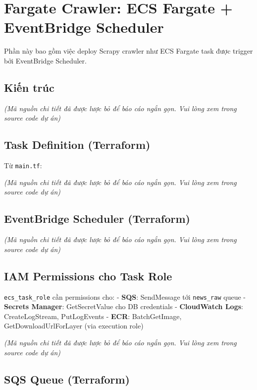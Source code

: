 \hypertarget{fargate-crawler-ecs-fargate-eventbridge-scheduler}{%
\section{Fargate Crawler: ECS Fargate + EventBridge
Scheduler}}

Phần này bao gồm việc deploy Scrapy crawler như ECS Fargate task được
trigger bởi EventBridge Scheduler.

\hypertarget{kiux1ebfn-truxfac}{%
\subsection{Kiến trúc}}

\emph{(Mã nguồn chi tiết đã được lược bỏ để báo cáo ngắn gọn. Vui lòng
xem trong source code dự án)}

\hypertarget{task-definition-terraform}{%
\subsection{Task Definition
(Terraform)}}

Từ \texttt{main.tf}:

\emph{(Mã nguồn chi tiết đã được lược bỏ để báo cáo ngắn gọn. Vui lòng
xem trong source code dự án)}

\hypertarget{eventbridge-scheduler-terraform}{%
\subsection{EventBridge Scheduler
(Terraform)}}

\emph{(Mã nguồn chi tiết đã được lược bỏ để báo cáo ngắn gọn. Vui lòng
xem trong source code dự án)}

\hypertarget{iam-permissions-cho-task-role}{%
\subsection{IAM Permissions cho Task
Role}}

\texttt{ecs\_task\_role} cần permissions cho: - \textbf{SQS}:
SendMessage tới \texttt{news\_raw} queue - \textbf{Secrets Manager}:
GetSecretValue cho DB credentials - \textbf{CloudWatch Logs}:
CreateLogStream, PutLogEvents - \textbf{ECR}: BatchGetImage,
GetDownloadUrlForLayer (via execution role)

\emph{(Mã nguồn chi tiết đã được lược bỏ để báo cáo ngắn gọn. Vui lòng
xem trong source code dự án)}

\hypertarget{sqs-queue-terraform}{%
\subsection{SQS Queue (Terraform)}}


